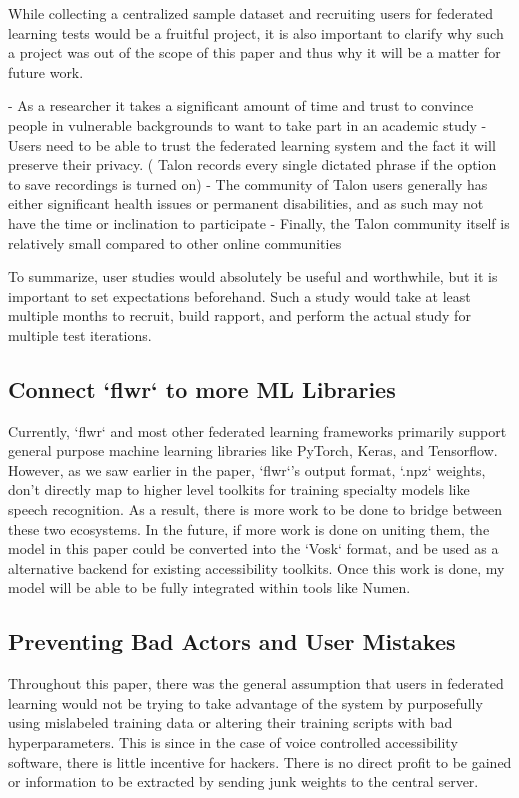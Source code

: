 \documentclass[manuscript,screen,review]{acmart}
\begin{document}
{While collecting a centralized sample dataset and recruiting users for federated learning tests would be a fruitful project, it is also important to clarify why such a project was out of the scope of this paper and thus why it will be a matter for future work.

- As a researcher it takes a significant amount of time and trust to convince people in vulnerable backgrounds to want to take part in an academic study
  - Users need to be able to trust the federated learning system and the fact it will preserve their privacy. ( Talon records every single dictated phrase if the option to save recordings is turned on)
- The community of Talon users generally has either significant health issues or permanent disabilities, and as such may not have the time or inclination to participate
- Finally, the Talon community itself is relatively small compared to other online communities

To summarize, user studies would absolutely be useful and worthwhile, but it is important to set expectations beforehand. Such a study would take at least multiple months to recruit, build rapport, and perform the actual study for multiple test iterations.

\subsection*{ Connect `flwr` to more ML Libraries}
Currently, `flwr` and most other federated learning frameworks primarily support general purpose machine learning libraries like PyTorch, Keras, and Tensorflow. However, as we saw earlier in the paper, `flwr`'s output format, `.npz` weights, don't directly map to higher level toolkits for training specialty models like speech recognition. As a result, there is more work to be done to bridge between these two ecosystems. In the future, if more work is done on uniting them, the model in this paper could be converted into the `Vosk` format, and be used as a alternative backend for existing accessibility toolkits. Once this work is done, my model will be able to be fully integrated within tools like Numen.

\subsection*{ Preventing Bad Actors and User Mistakes}

Throughout this paper, there was the general assumption that users in federated learning would not be trying to take advantage of the system by purposefully using mislabeled training data or altering their training scripts with bad hyperparameters. This is since in the case of voice controlled accessibility software, there is little incentive for hackers. There is no direct profit to be gained or information to be extracted by sending junk weights to the central server.

}
\end{document}

